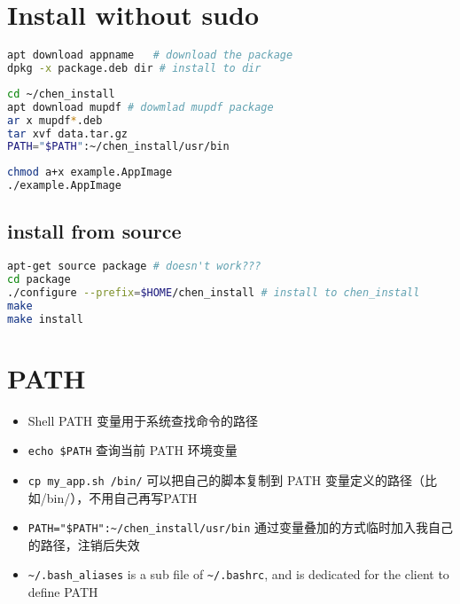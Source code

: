 \section{Install without sudo}

\begin{lstlisting}[language=bash, caption={dpkg install from deb}]
apt download appname   # download the package
dpkg -x package.deb dir # install to dir
\end{lstlisting}


\begin{lstlisting}[language=bash, caption={manually install from deb}]
cd ~/chen_install
apt download mupdf # dowmlad mupdf package
ar x mupdf*.deb 
tar xvf data.tar.gz
PATH="$PATH":~/chen_install/usr/bin
\end{lstlisting}

\begin{lstlisting}[language=bash, caption={run appimage}]
chmod a+x example.AppImage
./example.AppImage
\end{lstlisting}



\subsection{install from source}

\begin{lstlisting}[language=bash, caption={install from source}]
apt-get source package # doesn't work???
cd package
./configure --prefix=$HOME/chen_install # install to chen_install
make
make install
\end{lstlisting}


\section{PATH}

\begin{itemize}
\item Shell PATH 变量用于系统查找命令的路径
\item \verb|echo $PATH| 查询当前 PATH 环境变量
\item \verb|cp my_app.sh /bin/| 可以把自己的脚本复制到 PATH 变量定义的路径（比如/bin/），不用自己再写PATH
\item \verb|PATH="$PATH":~/chen_install/usr/bin| 通过变量叠加的方式临时加入我自己的路径，注销后失效
\item \verb|~/.bash_aliases| is a sub file of \verb|~/.bashrc|, and is dedicated for the client to define PATH
\end{itemize}



